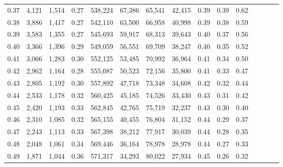\begin{tabular}{rrrcrrrrrrrrrrr}
0.37 &   4,121 &  1,514 &                                       0.27 &  538,224 &   67,386 &   65,541 &   42,415 &  0.39 &  0.39 &                         0.62 \\
0.38 &   3,886 &  1,417 &                                       0.27 &  542,110 &   63,500 &   66,958 &   40,998 &  0.39 &  0.38 &                         0.59 \\
0.39 &   3,583 &  1,355 &                                       0.27 &  545,693 &   59,917 &   68,313 &   39,643 &  0.40 &  0.37 &                         0.56 \\
0.40 &   3,366 &  1,396 &                                       0.29 &  549,059 &   56,551 &   69,709 &   38,247 &  0.40 &  0.35 &                         0.52 \\
0.41 &   3,066 &  1,283 &                                       0.30 &  552,125 &   53,485 &   70,992 &   36,964 &  0.41 &  0.34 &                         0.50 \\
0.42 &   2,962 &  1,164 &                                       0.28 &  555,087 &   50,523 &   72,156 &   35,800 &  0.41 &  0.33 &                         0.47 \\
0.43 &   2,805 &  1,192 &                                       0.30 &  557,892 &   47,718 &   73,348 &   34,608 &  0.42 &  0.32 &                         0.44 \\
0.44 &   2,533 &  1,178 &                                       0.32 &  560,425 &   45,185 &   74,526 &   33,430 &  0.43 &  0.31 &                         0.42 \\
0.45 &   2,420 &  1,193 &                                       0.33 &  562,845 &   42,765 &   75,719 &   32,237 &  0.43 &  0.30 &                         0.40 \\
0.46 &   2,310 &  1,085 &                                       0.32 &  565,155 &   40,455 &   76,804 &   31,152 &  0.44 &  0.29 &                         0.37 \\
0.47 &   2,243 &  1,113 &                                       0.33 &  567,398 &   38,212 &   77,917 &   30,039 &  0.44 &  0.28 &                         0.35 \\
0.48 &   2,048 &  1,061 &                                       0.34 &  569,446 &   36,164 &   78,978 &   28,978 &  0.44 &  0.27 &                         0.33 \\
0.49 &   1,871 &  1,044 &                                       0.36 &  571,317 &   34,293 &   80,022 &   27,934 &  0.45 &  0.26 &                         0.32 \\

\end{tabular}
